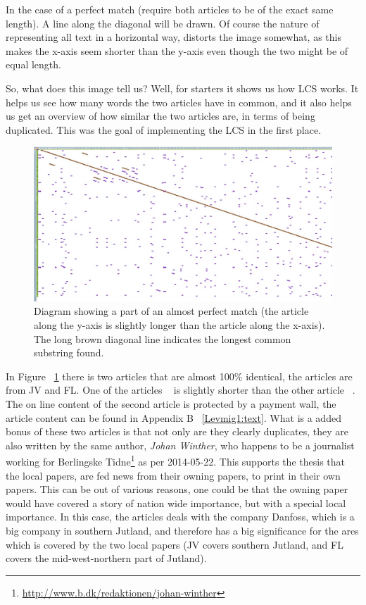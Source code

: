 In the case of a perfect match (require both articles to be of the exact same length). A line along the diagonal will be drawn. Of course the nature of representing all text in a horizontal way, distorts the image somewhat, as this makes the x-axis seem shorter than the y-axis even though the two might be of equal length. 

So, what does this image tell us? Well, for starters it shows us how LCS works. It helps us see how many words the two articles have in common, and it also helps us get an overview of how similar the two articles are, in terms of being duplicated. This was the goal of implementing the LCS in the first place.

\begin{figure}
	\centering
	\includegraphics[scale=0.35]{figures/PerfectMatch}
	\caption{Diagram showing a part of an almost perfect match (the article along the y-axis is slightly longer than the article along the x-axis). The long brown diagonal line indicates the longest common substring found.}
	\label{Match}
\end{figure}

In Figure ~\ref{Match} there is two articles that are almost 100\% identical, the articles are from JV and FL. One of the articles ~\cite{JV1} is slightly shorter than the other article ~\cite{Lemvig1}. The on line content of the second article is protected by a payment wall, the article content can be found in Appendix B ~\ref{Levmig1:text}.
What is a added bonus of these two articles is that not only are they clearly duplicates, they are also written by the same author, \textit{Johan Winther}, who happens to be a journalist working for Berlingske Tidne\footnote{\url{http://www.b.dk/redaktionen/johan-winther}} as per 2014-05-22. This supports the thesis that the local papers, are fed news from their owning papers, to print in their own papers. This can be out of various reasons, one could be that the owning paper would have covered a story of nation wide importance, but with a special local importance. In this case, the articles deals with the company Danfoss, which is a big company in southern Jutland, and therefore has a big significance for the ares which is covered by the two local papers (JV covers southern Jutland, and FL covers the mid-west-northern part of Jutland).


